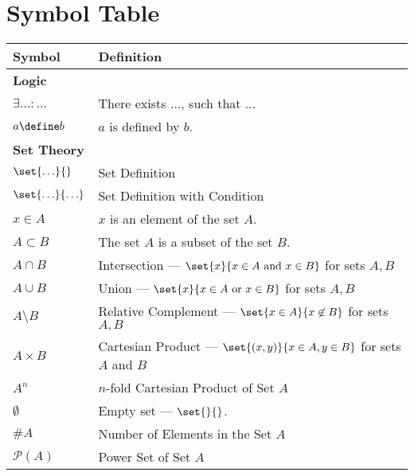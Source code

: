 \documentclass[crop=false,10pt,ngerman]{standalone}
\begin{document}
  \section*{Symbol Table}

  \bigskip

  \renewcommand{\arraystretch}{1.3}
  {
    \scriptsize
    \begin{tabularx}{\textwidth}{p{}p{}}
      \hline
      \textbf{Symbol} & \textbf{Definition} \\
      \hline
      \hline

      \textbf{Logic} & \\
      $\exists \ldots : \ldots$ & There exists $\ldots$, such that $\ldots$ \\
      $a\define b$ & $a$ is defined by $b$. \\

      \hline

      \textbf{Set Theory} & \\
      $\set{\ldots}{}$ & Set Definition \\
      $\set{\ldots}{\ldots}$ & Set Definition with Condition \\
      $x\in A$ & $x$ is an element of the set $A$. \\
      $A\subset B$ & The set $A$ is a subset of the set $B$. \\
      $A\cap B$ & Intersection --- $\set{x}{x\in A \text{ and } x\in B}$ for sets $A,B$ \\
      $A\cup B$ & Union --- $\set{x}{x\in A \text{ or } x\in B}$ for sets $A,B$ \\
      $A\setminus B$ & Relative Complement --- $\set{x\in A}{x\not\in B}$ for sets $A,B$ \\
      $A\times B$ & Cartesian Product --- $\set{(x,y)}{x\in A,y\in B}$ for sets $A$ and $B$ \\
      $A^n$ & $n$-fold Cartesian Product of Set $A$ \\
      $\emptyset$ & Empty set --- $\set{}{}$. \\
      $\# A$ & Number of Elements in the Set $A$ \\
      $\mathscr{P}(A)$ & Power Set of Set $A$ \\

      \hline


\end{tabularx}}
\end{document}
